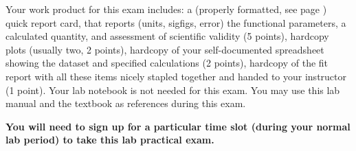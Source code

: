 Your work product for this exam includes:
a (properly formatted, see page \pageref{par:quick.report}) quick report card, 
that reports (units, sigfigs, error) the functional parameters, a
calculated quantity, and assessment of scientific validity (5 points),
hardcopy plots (usually two, 2 points),
hardcopy of your self-documented spreadsheet showing the dataset and 
specified calculations  (2 points),
hardcopy of the \WAPP fit report with all these items nicely stapled together
and handed to your instructor (1 point).
Your lab notebook is not needed for this exam.  You may use this lab manual and the textbook
as references during this exam.

{\bf You will need to sign up for a particular time slot (during your normal lab period) to take this lab practical exam.}